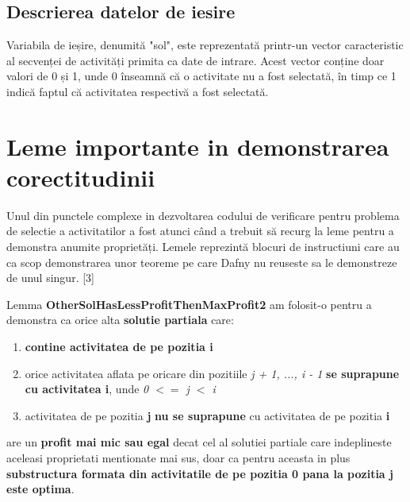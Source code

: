 \subsection{Descrierea datelor de iesire}
Variabila de ieșire, denumită "sol", este reprezentată printr-un vector caracteristic al secvenței de activități primita ca date de intrare. Acest vector conține doar valori de 0 și 1, unde 0 înseamnă că o activitate nu a fost selectată, în timp ce 1 indică faptul că activitatea respectivă a fost selectată.

\section{Leme importante in demonstrarea corectitudinii}
Unul din punctele complexe in dezvoltarea codului de verificare pentru problema de selectie a activitatilor a fost atunci când a trebuit să recurg la leme pentru a demonstra anumite proprietăți. Lemele reprezintă blocuri de instructiuni care au ca scop demonstrarea unor teoreme pe care Dafny nu reuseste sa le demonstreze de unul singur. [3]

Lemma \textbf{OtherSolHasLessProfitThenMaxProfit2} am folosit-o pentru a demonstra ca orice alta \textbf{solutie partiala} care:
\begin{enumerate}
    \item \textbf{contine activitatea de pe pozitia i}
    \item orice activitatea aflata pe oricare din pozitiile \textit{j + 1, ..., i - 1} \textbf{se suprapune cu activitatea i}, unde \textit{0 $<=$ j $<$ i}
    \item activitatea de pe pozitia \textbf{j} \textbf{nu se suprapune} cu activitatea de pe pozitia \textbf{i} 
\end{enumerate}
are un \textbf{profit mai mic sau egal} decat cel al solutiei partiale care indeplineste aceleasi proprietati mentionate mai sus, doar ca pentru aceasta in plus \textbf{substructura formata din activitatile de pe pozitia 0 pana la pozitia j este optima}. 

